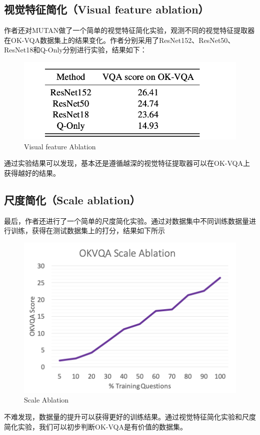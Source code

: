 \documentclass[conference,10pt]{IEEEtran}
\begin{document}
\subsection{视觉特征简化（Visual feature ablation）}
作者还对MUTAN做了一个简单的视觉特征简化实验，观测不同的视觉特征提取器在OK-VQA数据集上的结果变化。作者分别采用了ResNet152、ResNet50、ResNet18和Q-Only分别进行实验，结果如下：
\begin{figure}[H]
	\centering
	\includegraphics[scale=0.4]{figure/Visualfeature.png}
	\caption{Visual feature Ablation}
	\label{visual}
\end{figure}
通过实验结果可以发现，基本还是遵循越深的视觉特征提取器可以在OK-VQA上获得越好的结果。
\subsection{尺度简化（Scale ablation）}
最后，作者还进行了一个简单的尺度简化实验。通过对数据集中不同训练数据量进行训练，获得在测试数据集上的打分，结果如下所示
\begin{figure}[H]
	\centering
	\includegraphics[scale=0.4]{figure/Scale.png}
	\caption{Scale Ablation}
	\label{scale}
\end{figure}
不难发现，数据量的提升可以获得更好的训练结果。通过视觉特征简化实验和尺度简化实验，我们可以初步判断OK-VQA是有价值的数据集。
\end{document}

